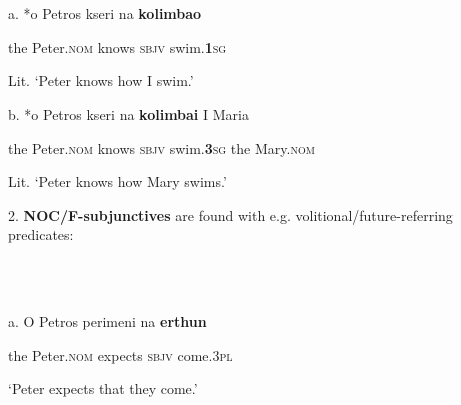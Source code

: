 \documentclass[output=paper]{langsci/langscibook}
\begin{document}
\begin{styleNurTexti}
\ea%
    \label{ex:key:4}
    \gll\\
        \\
    \glt
    \z

          a.    *o Petros      kseri     na   \textbf{kolimbao}    
\end{styleNurTexti}

\begin{styleNurTexti}
      the Peter.\textsc{nom}   knows  \textsc{sbjv}   swim.\textbf{\textsc{1}}\textsc{sg}
\end{styleNurTexti}

\begin{styleNurTexti}
   Lit. ‘Peter knows how I swim.’
\end{styleNurTexti}

\begin{styleNurTexti}
  b.  *o  Petros    kseri    na   \textbf{kolimbai}   I    Maria
\end{styleNurTexti}

\begin{styleNurTexti}
       the Peter.\textsc{nom}  knows  \textsc{sbjv}   swim.\textbf{\textsc{3}}\textsc{sg} the   Mary.\textsc{nom}
\end{styleNurTexti}

\begin{styleNurTexti}
    Lit. ‘Peter knows how Mary swims.’
\end{styleNurTexti}

\begin{styleNurTexti}
2. \textbf{NOC/F-subjunctives} are found with e.g. volitional/future-referring predicates:
\end{styleNurTexti}

\begin{styleNurTexti}
\ea%
    \label{ex:key:5}
    \gll\\
        \\
    \glt
    \z

          a.  O    Petros      perimeni  na    \textbf{erthun}    
\end{styleNurTexti}

\begin{styleNurTexti}
       the    Peter.\textsc{nom} expects  \textsc{sbjv}  come.\textsc{3pl}
\end{styleNurTexti}

\begin{styleNurTexti}
       ‘Peter expects that they come.’
\end{styleNurTexti}
\end{document}
